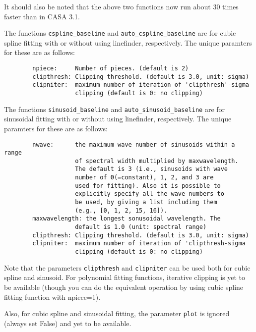 It should also be noted that the above two functions now run about 30 times 
faster than in CASA 3.1. 

The functions {\tt cspline\_baseline} and {\tt auto\_cspline\_baseline} 
are for cubic spline fitting with or without using linefinder, respectively. 
The unique paramters for these are as follows:

\small
\begin{verbatim}
        npiece:     Number of pieces. (default is 2)
        clipthresh: Clipping threshold. (default is 3.0, unit: sigma)
        clipniter:  maximum number of iteration of 'clipthresh'-sigma 
                    clipping (default is 0: no clipping)
\end{verbatim}
\normalsize

The functions {\tt sinusoid\_baseline} and {\tt auto\_sinusoid\_baseline} 
are for sinusoidal fitting with or without using linefinder, respectively. 
The unique paramters for these are as follows:

\small
\begin{verbatim}
        nwave:      the maximum wave number of sinusoids within a range 
                    of spectral width multiplied by maxwavelength.
                    The default is 3 (i.e., sinusoids with wave 
                    number of 0(=constant), 1, 2, and 3 are 
                    used for fitting). Also it is possible to 
                    explicitly specify all the wave numbers to 
                    be used, by giving a list including them 
                    (e.g., [0, 1, 2, 15, 16]).
        maxwavelength: the longest sonusoidal wavelength. The 
                    default is 1.0 (unit: spectral range)
        clipthresh: Clipping threshold. (default is 3.0, unit: sigma)
        clipniter:  maximum number of iteration of 'clipthresh-sigma 
                    clipping (default is 0: no clipping)
\end{verbatim}
\normalsize

Note that the parameters {\tt clipthresh} and {\tt clipniter} can be used 
both for cubic spline and sinusoid. For polynomial fitting functions, 
iterative clipping is yet to be available (though you can do the equivalent 
operation by using cubic spline fitting function with npiece=1). 

Also, for cubic spline and sinusoidal fitting, the parameter {\tt plot} is 
ignored (always set False) and yet to be available. 


